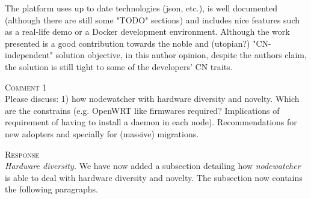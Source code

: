 \documentclass[12pt,twoside,a4paper]{report}
\newcommand{\nodewatcher}{\textit{nodewatcher}}
\begin{document}
The platform uses up to date technologies (json, etc.), is well documented (although there are still some "TODO" sections) and includes nice features such as a real-life demo or a Docker development environment. Although the work presented is a good contribution towards the noble and (utopian?) "CN-independent" solution objective, in this author opinion, despite the authors claim, the solution is still tight to some of the developers' CN traits.

\vspace{0.5cm}\noindent\textsc{Comment 1}\\
Please discuss: 1) how nodewatcher with hardware diversity and novelty. Which are the constrains (e.g. OpenWRT like firmwares required? Implications of requirement of having to install a daemon in each node). Recommendations for new adopters and specially for (massive) migrations.

\vspace{0.5cm}\noindent\textsc{Response}\\
{\em Hardware diversity.} We have now added a subsection detailing how \nodewatcher{} is able to deal with hardware diversity and novelty.
The subsection now contains the following paragraphs.
\end{document}
